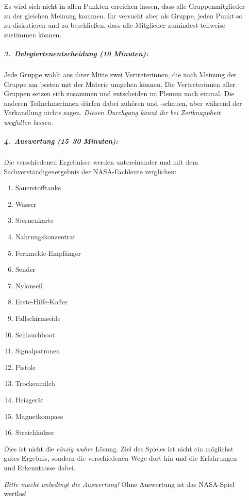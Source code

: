 Es wird sich nicht in allen Punkten erreichen lassen, dass alle Gruppenmitglieder zu der gleichen Meinung kommen. Ihr versucht aber als Gruppe, jeden Punkt so zu diskutieren und zu beschließen, dass alle Mitglieder zumindest teilweise zustimmen können.
\subparagraph{3.~Delegiertenentscheidung (10 Minuten):} Jede Gruppe wählt aus ihrer Mitte zwei Vertreterinnen, die nach Meinung der Gruppe am besten mit der Materie umgehen können. Die Vertreterinnen aller Gruppen setzen sich zusammen und entscheiden im Plenum noch einmal. Die anderen Teilnehmerinnen dürfen dabei zuhören  und -schauen, aber während der Verhandlung nichts sagen. \emph{Diesen Durchgang könnt ihr bei Zeitknappheit wegfallen lassen.}
\subparagraph{4.~Auswertung (15--30 Minuten):} Die verschiedenen Ergebnisse werden untereinander und mit dem Sachverständigenergebnis der NASA-Fachleute verglichen:
	\begin{enumerate}
	\item Sauerstofftanks
	\item Wasser
	\item Sternenkarte
	\item Nahrungskonzentrat
	\item Fernmelde-Empfänger
	\item Sender
	\item Nylonseil
	\item Erste-Hilfe-Koffer
	\item Fallschirmseide
	\item Schlauchboot
	\item Signalpatronen
	\item Pistole
	\item Trockenmilch
	\item Heizgerät
	\item Magnetkompass
	\item Streichhölzer
	\end{enumerate}
Dies ist nicht die \emph{einzig wahre} Lösung. Ziel des Spieles ist nicht ein möglichst gutes Ergebnis, sondern die verschiedenen Wege dort hin und die Erfahrungen und Erkenntnisse dabei.

\emph{Bitte macht unbedingt die Auswertung!} Ohne Auswertung ist das NASA-Spiel wertlos!

